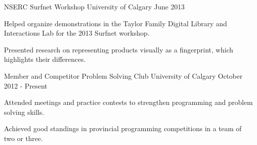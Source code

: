 \begin{cventries}
    {NSERC Surfnet Workshop}
    {University of Calgary}
    {June 2013}
    {
      \begin{cvitems}
        \item {Helped organize demonstrations in the Taylor Family Digital Library and Interactions Lab for the 2013 Surfnet workshop.}
        \item {Presented research on representing products visually as a fingerprint, which highlights their differences.}
      \end{cvitems}
    }
  \cventry
    {Member and Competitor}
    {Problem Solving Club}
    {University of Calgary}
    {October 2012 - Present}
    {
      \begin{cvitems}
        \item {Attended meetings and practice contests to strengthen programming and problem solving skills.}
        \item {Achieved good standings in provincial programming competitions in a team of two or three.}
      \end{cvitems}
    }
\end{cventries}
